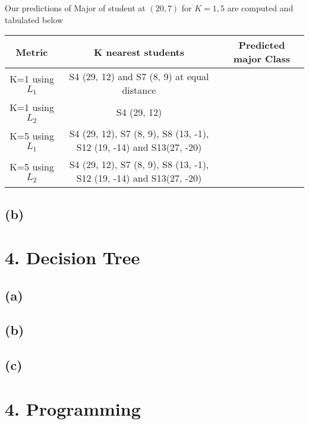 \documentclass[letterpaper,doc,notimes]{apa6}
\begin{document}
Our predictions of Major of student at $(20, 7)$ for $K= 1, 5$ are computed and tabulated below


\begin{tabular}{| c || c | c |}
	\hline
	Metric 			& K nearest students & Predicted major Class \\
	\hline
	K=1 using $L_1$ & S4 (29, 12) and S7 (8, 9) at equal distance & \\
	K=1 using $L_2$ & S4 (29, 12) & \\
	K=5 using $L_1$ & S4 (29, 12), S7 (8, 9), S8 (13, -1), S12 (19, -14) and S13(27, -20) & \\
	K=5 using $L_2$ & S4 (29, 12), S7 (8, 9), S8 (13, -1), S12 (19, -14) and S13(27, -20) & \\
	\hline
\end{tabular}

\subsection{(b)}


\section{4. Decision Tree}
\subsection{(a)}
\subsection{(b)}
\subsection{(c)}

\section{4. Programming}
\end{document}
